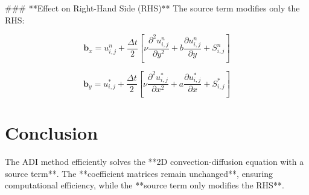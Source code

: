 \documentclass{article}
\begin{document}
### **Effect on Right-Hand Side (RHS)**
The source term modifies only the RHS:

\[
\mathbf{b}_x = u_{i,j}^{n} + \frac{\Delta t}{2} \left[ \nu \frac{\partial^2 u_{i,j}^{n}}{\partial y^2} + b \frac{\partial u_{i,j}^{n}}{\partial y} + S_{i,j}^{n} \right]
\]

\[
\mathbf{b}_y = u_{i,j}^{*} + \frac{\Delta t}{2} \left[ \nu \frac{\partial^2 u_{i,j}^{*}}{\partial x^2} + a \frac{\partial u_{i,j}^{*}}{\partial x} + S_{i,j}^{*} \right]
\]

\section{Conclusion}
The ADI method efficiently solves the **2D convection-diffusion equation with a source term**. The **coefficient matrices remain unchanged**, ensuring computational efficiency, while the **source term only modifies the RHS**.
\end{document}
